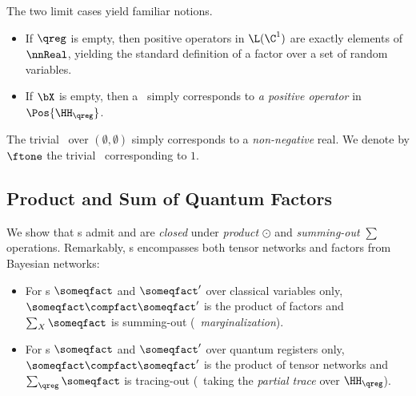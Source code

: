 \begin{remark}
The two limit cases yield familiar notions.
\begin{itemize}
\item
If $\qreg$ is empty, then positive operators in $\L(\C^1)$ are exactly elements of $\nnReal$, yielding the standard definition of a factor over a set of random variables.
\item
If $\bX$ is empty, then a \qfactor\ simply corresponds to \emph{a positive operator} in $\Pos{\HH_\qreg}$.
\end{itemize}
\end{remark}

The trivial \qfactor\ over $(\emptyset,\emptyset)$ simply corresponds to a \emph{non-negative} real.
We denote by $\ftone$ the trivial \qfactor\ corresponding to $1$.

\subsection{Product and Sum of Quantum Factors}

We show that \qfactor s admit and are \emph{closed} under \emph{product} $\odot$ and \emph{summing-out} $\sum$ operations.
Remarkably, \qfactor s encompasses both tensor networks and factors from Bayesian networks:
\begin{itemize}
\item
For \qfactor s $\someqfact$ and $\someqfact'$ over classical variables only, $\someqfact \compfact \someqfact'$ is the product of factors and $\sum_X \someqfact$ is summing-out (\aka\ \emph{marginalization}).
\item
For \qfactor s $\someqfact$ and $\someqfact'$ over quantum registers only, $\someqfact \compfact \someqfact'$ is the product of tensor networks %
and $\sum_\qreg \someqfact$ is tracing-out (\ie\ taking the \emph{partial trace} over $\HH_\qreg$).
\end{itemize}

